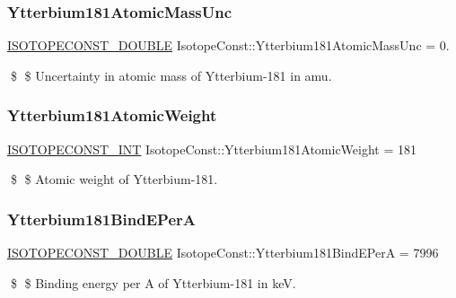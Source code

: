\subsubsection{\texorpdfstring{Ytterbium181\+Atomic\+Mass\+Unc}{Ytterbium181AtomicMassUnc}}
{\footnotesize\ttfamily \mbox{\hyperlink{group___isotope_const-_macros_ga8f45a7272ce02c0b4c65c44636ed719a}{I\+S\+O\+T\+O\+P\+E\+C\+O\+N\+S\+T\+\_\+\+D\+O\+U\+B\+LE}} Isotope\+Const\+::\+Ytterbium181\+Atomic\+Mass\+Unc = 0.}

\$ \$ Uncertainty in atomic mass of Ytterbium-\/181 in amu. \mbox{\label{group___isotope_const-_ytterbium-_yb181_gaeb8d86cd0d5cca7f541f40ddad15810f}} 
\subsubsection{\texorpdfstring{Ytterbium181\+Atomic\+Weight}{Ytterbium181AtomicWeight}}
{\footnotesize\ttfamily \mbox{\hyperlink{group___isotope_const-_macros_ga5f18360b3e99483a35c32d789e62621c}{I\+S\+O\+T\+O\+P\+E\+C\+O\+N\+S\+T\+\_\+\+I\+NT}} Isotope\+Const\+::\+Ytterbium181\+Atomic\+Weight = 181}

\$ \$ Atomic weight of Ytterbium-\/181. \mbox{\label{group___isotope_const-_ytterbium-_yb181_gad026a5a73594e8b8a1c5cc1ef0bdf674}} 
\subsubsection{\texorpdfstring{Ytterbium181\+Bind\+E\+PerA}{Ytterbium181BindEPerA}}
{\footnotesize\ttfamily \mbox{\hyperlink{group___isotope_const-_macros_ga8f45a7272ce02c0b4c65c44636ed719a}{I\+S\+O\+T\+O\+P\+E\+C\+O\+N\+S\+T\+\_\+\+D\+O\+U\+B\+LE}} Isotope\+Const\+::\+Ytterbium181\+Bind\+E\+PerA = 7996}

\$ \$ Binding energy per A of Ytterbium-\/181 in keV. \mbox{\label{group___isotope_const-_ytterbium-_yb181_gacc9eae2bae44fafe93ad9da90627091f}} 
